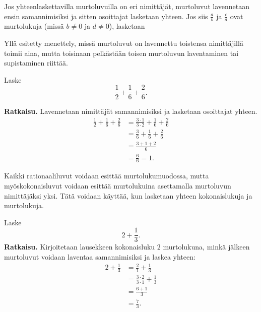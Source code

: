 Jos yhteenlaskettavilla murtoluvuilla on eri nimittäjät, murtoluvut lavennetaan ensin samannimisiksi ja sitten osoittajat lasketaan yhteen. Jos siis $\frac{a}{b}$ ja $\frac{c}{d}$ ovat murtolukuja (missä $b \neq 0$ ja $d \neq 0$), lasketaan

 
Yllä esitetty menettely, missä murtoluvut on lavennettu toistensa nimittäjillä toimii aina, mutta toisinaan pelkästään toisen murtoluvun laventaminen tai supistaminen riittää.

\begin{esimerkki}
        Laske
        \[
        \frac{1}{2} + \frac{1}{6} + \frac{2}{6}.
        \]
        
        \textbf{Ratkaisu.}
        Lavennetaan nimittäjät samannimisiksi ja lasketaan osoittajat yhteen.
        \begin{align*}
            \frac{1}{2} + \frac{1}{6} + \frac{2}{6} &=\frac{3\cdot 1}{3\cdot 2} + \frac{1}{6} + \frac{2}{6}\\
            										&=\frac{3}{6} + \frac{1}{6} + \frac{2}{6}\\
           											&= \frac{3+1+2}{6}\\
           											&= \frac{6}{6} = 1.
        \end{align*}
    \end{esimerkki}
    Kaikki rationaaliluvut voidaan esittää murtolukumuodossa, mutta myöskokonaisluvut voidaan esittää murtolukuina asettamalla murtoluvun nimittäjäksi yksi. Tätä voidaan käyttää, kun lasketaan yhteen kokonaislukuja ja murtolukuja.
    
    \begin{esimerkki}
        Laske\[ 2 + \frac{1}{3}.\]
        \textbf{Ratkaisu.}
        Kirjoitetaan lausekkeen kokonaisluku $2$ murtolukuna, minkä jälkeen murtoluvut voidaan laventaa samannimisiksi ja laskea yhteen:
        \begin{align*}
           2 + \frac{1}{3} &= \frac{2}{1} + \frac{1}{3}  \\ 
	   &= \frac{3 \cdot 2}{3 \cdot 1} + \frac{1}{3} \\ 
	   &= \frac{6+1}{3} \\ 
	   &= \frac{7}{3}.
        \end{align*}
    \end{esimerkki}
    
